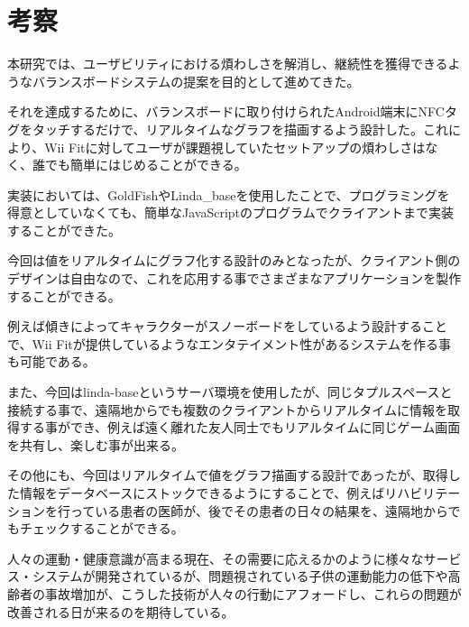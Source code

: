 \chapter{考察}
\label{chap:06}


本研究では、ユーザビリティにおける煩わしさを解消し、継続性を獲得できるようなバランスボードシステムの提案を目的として進めてきた。

それを達成するために、バランスボードに取り付けられたAndroid端末にNFCタグをタッチするだけで、リアルタイムなグラフを描画するよう設計した。これにより、Wii Fitに対してユーザが課題視していたセットアップの煩わしさはなく、誰でも簡単にはじめることができる。

実装においては、GoldFishやLinda_baseを使用したことで、プログラミングを得意としていなくても、簡単なJavaScriptのプログラムでクライアントまで実装することができた。

今回は値をリアルタイムにグラフ化する設計のみとなったが、クライアント側のデザインは自由なので、これを応用する事でさまざまなアプリケーションを製作することができる。

例えば傾きによってキャラクターがスノーボードをしているよう設計することで、Wii Fitが提供しているようなエンタテイメント性があるシステムを作る事も可能である。

また、今回はlinda-baseというサーバ環境を使用したが、同じタプルスペースと接続する事で、遠隔地からでも複数のクライアントからリアルタイムに情報を取得する事ができ、例えば遠く離れた友人同士でもリアルタイムに同じゲーム画面を共有し、楽しむ事が出来る。

その他にも、今回はリアルタイムで値をグラフ描画する設計であったが、取得した情報をデータベースにストックできるようにすることで、例えばリハビリテーションを行っている患者の医師が、後でその患者の日々の結果を、遠隔地からでもチェックすることができる。

人々の運動・健康意識が高まる現在、その需要に応えるかのように様々なサービス・システムが開発されているが、問題視されている子供の運動能力の低下や高齢者の事故増加が、こうした技術が人々の行動にアフォードし、これらの問題が改善される日が来るのを期待している。

